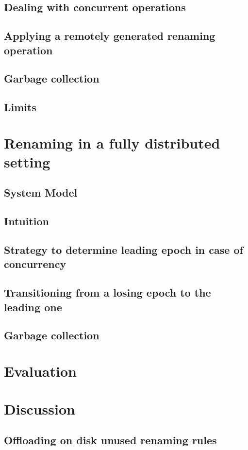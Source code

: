 \documentclass{article}
\begin{document}
\subsection{Dealing with concurrent operations}
\subsection{Applying a remotely generated renaming operation}
\subsection{Garbage collection}
\subsection{Limits}

\section{Renaming in a fully distributed setting}

\subsection{System Model}
\subsection{Intuition}
\subsection{Strategy to determine leading epoch in case of concurrency}
\subsection{Transitioning from a losing epoch to the leading one}
\subsection{Garbage collection}

\section{Evaluation}

\section{Discussion}

\subsection{Offloading on disk unused renaming rules}
\end{document}
